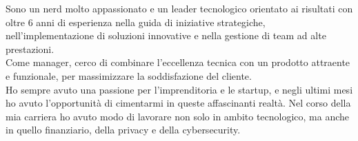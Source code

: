 
\begin{cvparagraph}
    Sono un nerd molto appassionato e un leader tecnologico orientato ai risultati con oltre 6 anni di esperienza nella guida di iniziative strategiche, nell'implementazione di soluzioni innovative e nella gestione di team ad alte prestazioni.
    \\Come manager, cerco di combinare l'eccellenza tecnica con un prodotto attraente e funzionale, per massimizzare la soddisfazione del cliente.
    \\Ho sempre avuto una passione per l'imprenditoria e le startup, e negli ultimi mesi ho avuto l'opportunità di cimentarmi in queste affascinanti realtà.
    Nel corso della mia carriera ho avuto modo di lavorare non solo in ambito tecnologico, ma anche in quello finanziario, della privacy e della cybersecurity.
\end{cvparagraph}